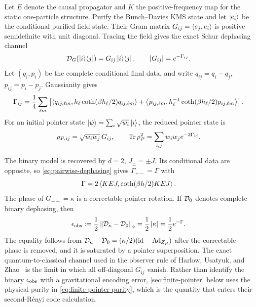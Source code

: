Let $E$ denote the causal propagator and $K$ the positive-frequency map for the
static one-particle structure.  Purify the Bunch--Davies KMS state and let
$\left\lvert e_i\right\rangle$ be the conditional purified field state.  Their Gram matrix
$G_{ij}=\left\langle e_j,e_i\right\rangle$ is positive semidefinite with unit diagonal.  Tracing
the field gives the exact Schur dephasing channel
\begin{equation}
 \mathcal D_G(\left\lvert i\right\rangle\!\left\langle j\right\rvert)=G_{ij}\left\lvert i\right\rangle\!\left\langle j\right\rvert,
 \qquad
 \left\lvert G_{ij}\right\rvert=e^{-\Gamma_{ij}}.
 \label{eq:dephasing-channel}
\end{equation}
Let $(q_i,p_i)$ be the complete conditional final data, and write
$q_{ij}=q_i-q_j$, $p_{ij}=p_i-p_j$.  Gaussianity gives
\begin{equation}
 \Gamma_{ij}=\frac14\sum_{\ell m}\left[
 \left\langle q_{ij,\ell m},h_\ell\coth(\beta h_\ell/2)q_{ij,\ell m}\right\rangle
 +\left\langle p_{ij,\ell m},h_\ell^{-1}\coth(\beta h_\ell/2)p_{ij,\ell m}\right\rangle
 \right].
 \label{eq:pairwise-dephasing}
\end{equation}
For an initial pointer state
$\left\lvert\psi\right\rangle=\sum_i\sqrt{w_i}\left\lvert i\right\rangle$, the reduced pointer state is
\begin{equation}
 \rho_{P,ij}=\sqrt{w_iw_j}\,G_{ij},
 \qquad
 \operatorname{Tr}\rho_P^2=\sum_{i,j}w_iw_j e^{-2\Gamma_{ij}}.
 \label{eq:finite-pointer-purity}
\end{equation}

The binary model is recovered by $d=2$, $J_\pm=\pm J$.  Its conditional data
are opposite, so \cref{eq:pairwise-dephasing} gives
$\Gamma_{+-}=\Gamma$ with
\begin{equation}
 \Gamma=2\left\langle KEJ,\coth(\beta h/2)KEJ\right\rangle.
\end{equation}
The phase of $G_{+-}=\kappa$ is a correctable pointer rotation.  If $\mathcal D_0$
denotes complete binary dephasing, then
\begin{equation}
 \epsilon_{\mathrm{obs}}:=\frac12\left\lVert\mathcal D_\kappa-\mathcal D_0\right\rVert_\diamond
 =\frac12\left\lvert\kappa\right\rvert=\frac12e^{-\Gamma}.
 \label{eq:diamond-error}
\end{equation}
The equality follows from
$\mathcal D_\kappa-\mathcal D_0=(\kappa/2)(\mathrm{id}-\operatorname{Ad}_{Z_P})$ after the
correctable phase is removed, and it is saturated by a pointer superposition.
The exact quantum-to-classical channel used in the observer rule of Harlow,
Usatyuk, and Zhao~\cite{HarlowUsatyukZhao2025} is the limit in which all
off-diagonal $G_{ij}$ vanish.  Rather than identify the binary $\epsilon_{\mathrm{obs}}$ with a
gravitational encoding error, \cref{sec:finite-pointer} below uses the
physical purity in \cref{eq:finite-pointer-purity}, which is the quantity that
enters their second-R\'enyi code calculation.

